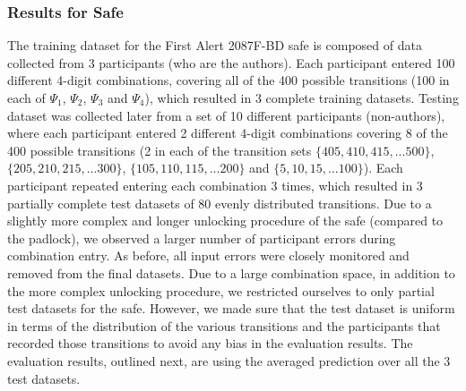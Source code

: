\documentclass[]{IEEEtran}
\begin{document}
\subsubsection{\textbf{Results for Safe}}
\label{safedeteval}
The training dataset for the First Alert 2087F-BD safe is composed of data collected from 3 participants (who are the authors). Each participant entered 100 different 4-digit combinations, covering all of the 400 possible transitions (100 in each of $\Psi_{1}$, $\Psi_{2}$, $\Psi_{3}$ and $\Psi_{4}$), which resulted in 3 complete training datasets. Testing dataset was collected later from a set of 10 different participants (non-authors), where each participant entered 2 different 4-digit combinations covering 8 of the 400 possible transitions (2 in each of the transition sets $\{405, 410, 415, ... 500\}$, $\{205, 210, 215, ... 300\}$, $\{105, 110, 115, ... 200\}$ and $\{5, 10, 15, ... 100\}$). Each participant repeated entering each combination 3 times, which resulted in 3 partially complete test datasets of 80 evenly distributed transitions. Due to a slightly more complex and longer unlocking procedure of the safe (compared to the padlock), we observed a larger number of participant errors during combination entry. As before, all input errors were closely monitored and removed from the final datasets. Due to a large combination space, in addition to the more complex unlocking procedure, we restricted ourselves to only partial test datasets for the safe. However, we made sure that the test dataset is uniform in terms of the distribution of the various transitions and the participants that recorded those transitions to avoid any bias in the evaluation results. The evaluation results, outlined next, are using the averaged prediction over all the 3 test datasets.
\end{document}
